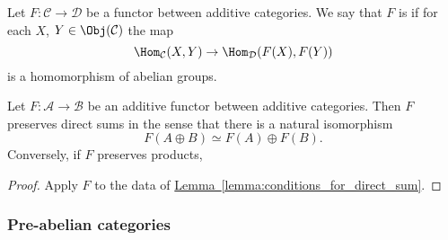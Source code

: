 \documentclass[main.tex]{subfiles}
\begin{document}
\begin{definition}
  \label{def:additivefunctor}
  Let $F\colon \mathcal{C} \rightarrow \mathcal{D}$ be a functor between additive categories. We say that $F$ is  if for each $X$, $Y \in \Obj(\mathcal{C})$ the map
  \begin{equation*}
    \Hom_{\mathcal{C}}(X, Y) \to \Hom_{\mathcal{D}}(F(X), F(Y))
  \end{equation*}
  is a homomorphism of abelian groups.
\end{definition}


\begin{corollary}
  Let $F\colon \mathcal{A} \to \mathcal{B}$ be an additive functor between additive categories. Then $F$ preserves direct sums in the sense that there is a natural isomorphism
  \begin{equation*}
    F(A \oplus B) \simeq F(A) \oplus F(B).
  \end{equation*}
  Conversely, if $F$ preserves products,
\end{corollary}
\begin{proof}
  Apply $F$ to the data of \hyperref[lemma:conditions_for_direct_sum]{Lemma~\ref*{lemma:conditions_for_direct_sum}}.
\end{proof}

\subsubsection{Pre-abelian categories}
\end{document}
